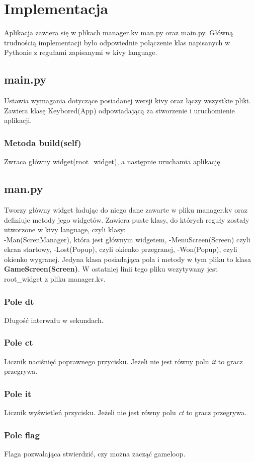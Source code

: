 \documentclass[11pt]{article}
\begin{document}
\section{Implementacja}
Aplikacja zawiera się w plikach manager.kv man.py oraz main.py. Główną trudnością implementacji było odpowiednie połączenie klas napisanych w Pythonie z regułami zapisanymi w kivy language.
\subsection{main.py}
Ustawia wymagania dotyczące posiadanej wersji kivy oraz łączy wszystkie pliki. Zawiera klasę Keybored(App) odpowiadającą za stworzenie i uruchomienie aplikacji.
\subsubsection{Metoda build(self)}
Zwraca główny widget(root\_widget), a następnie uruchamia aplikację.
\subsection{man.py}
Tworzy główny widget ładując do niego dane zawarte w pliku manager.kv oraz definiuje metody jego widgetów. Zawiera puste klasy, do których reguły zostały utworzone w kivy language, czyli klasy:\\
-Man(ScrenManager), która jest głównym widgetem,
-MenuScreen(Screen) czyli ekran startowy,
-Lost(Popup), czyli okienko przegranej,
-Won(Popup), czyli okienko wygranej.
Jedyna klasa posiadająca pola i metody w tym pliku to klasa \textbf{GameScreen(Screen)}. W ostatniej linii tego pliku wczytywany jest root\_widget z pliku manager.kv.
\subsubsection{Pole dt}
Długość interwału w sekundach.
\subsubsection{Pole ct}
Licznik naciśnięć poprawnego przycisku. Jeżeli nie jest równy polu \textit{it} to gracz przegrywa.
\subsubsection{Pole it}
Licznik wyświetleń przycisku. Jeżeli nie jest równy polu \textit{ct} to gracz przegrywa.
\subsubsection{Pole flag}
Flaga pozwalająca stwierdzić, czy można zacząć gameloop.
\end{document}
